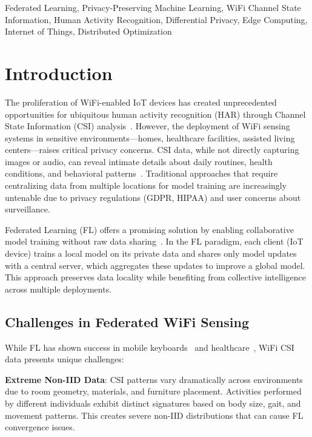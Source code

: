 \documentclass[journal]{IEEEtran}
\begin{document}
\begin{IEEEkeywords}
Federated Learning, Privacy-Preserving Machine Learning, WiFi Channel State Information, Human Activity Recognition, Differential Privacy, Edge Computing, Internet of Things, Distributed Optimization
\end{IEEEkeywords}

\section{Introduction}

The proliferation of WiFi-enabled IoT devices has created unprecedented opportunities for ubiquitous human activity recognition (HAR) through Channel State Information (CSI) analysis~\cite{yang2023sensefi,liu2024wifi}. However, the deployment of WiFi sensing systems in sensitive environments—homes, healthcare facilities, assisted living centers—raises critical privacy concerns. CSI data, while not directly capturing images or audio, can reveal intimate details about daily routines, health conditions, and behavioral patterns~\cite{privacy2023wifi}. Traditional approaches that require centralizing data from multiple locations for model training are increasingly untenable due to privacy regulations (GDPR, HIPAA) and user concerns about surveillance.

Federated Learning (FL) offers a promising solution by enabling collaborative model training without raw data sharing~\cite{mcmahan2017fedavg,li2020federated}. In the FL paradigm, each client (IoT device) trains a local model on its private data and shares only model updates with a central server, which aggregates these updates to improve a global model. This approach preserves data locality while benefiting from collective intelligence across multiple deployments.

\subsection{Challenges in Federated WiFi Sensing}

While FL has shown success in mobile keyboards~\cite{hard2018federated} and healthcare~\cite{rieke2020future}, WiFi CSI data presents unique challenges:

\textbf{Extreme Non-IID Data}: CSI patterns vary dramatically across environments due to room geometry, materials, and furniture placement. Activities performed by different individuals exhibit distinct signatures based on body size, gait, and movement patterns. This creates severe non-IID distributions that can cause FL convergence issues.
\end{document}
